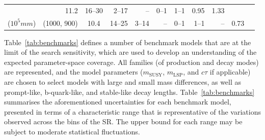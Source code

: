 \begin{table}[!t]
{\begin{tabular}{ lrcrrrrrrcc }
      & 11.2           & 16--30 & 2--17  & --     & 0--1  & 1--1  & 0.95 & 1.33 \\
      ($10^{5}\unit{mm}$)
      & (1000, 900)  %
      & 10.4           & 14--25 & 3--14  & --     & 0--1  & 1--1  & --   & 0.73 \\ [0.5ex]
      \hline
    \end{tabular}
  }
\end{table}
\endgroup

Table~\ref{tab:benchmarks} defines a number of benchmark models that
are at the limit of the search sensitivity, which are used to develop
an understanding of the expected parameter-space coverage. All
families (of production and decay modes) are represented, and the
model parameters ($m_\text{SUSY}$, $m_\text{LSP}$, and $c\tau$ if
applicable) are chosen to select models with large and small mass
differences, as well as prompt-like, b-quark-like, and stable-like
decay lengths. Table~\ref{tab:benchmarks} summarises the
aforementioned uncertainties for each benchmark model, presented in
terms of a characteristic range that is representative of the
variations observed across the bins of the SR. The upper bound for
each range may be subject to moderate statistical fluctuations.


